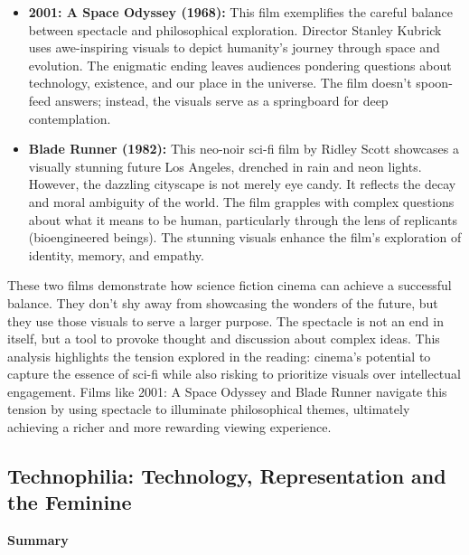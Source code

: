 \documentclass[11pt,fleqn]{book}
\begin{document}
\begin{itemize}
\item \textbf{2001: A Space Odyssey (1968):} This film exemplifies the careful balance between spectacle and philosophical exploration. Director Stanley Kubrick uses awe-inspiring visuals  to depict humanity's journey through space and evolution. The enigmatic ending leaves audiences pondering questions about  technology, existence, and our place in the universe. The film doesn't spoon-feed answers; instead, the visuals serve as a springboard for deep contemplation. 

\item \textbf{Blade Runner (1982):} This neo-noir sci-fi film by Ridley Scott  showcases a visually stunning future Los Angeles, drenched in rain and neon lights. However, the dazzling cityscape is not merely eye candy. It reflects the decay and moral ambiguity of the world. The film grapples with complex questions about  what it means to be human, particularly through the lens of replicants (bioengineered beings). The stunning visuals enhance the film's exploration of identity, memory, and empathy. 
\end{itemize}
\vspace{5pt}
These two films demonstrate how science fiction cinema can achieve  a successful balance. They don't shy away from  showcasing  the wonders of the future, but they use those visuals to serve a larger purpose. The spectacle is not an end in itself, but a tool to  provoke thought and discussion about complex ideas. This analysis highlights the tension  explored in the reading: cinema's potential to capture the essence of sci-fi while also  risking  to prioritize visuals over intellectual engagement. Films like 2001: A Space Odyssey and Blade Runner navigate this tension  by using spectacle to  illuminate  philosophical themes,  ultimately achieving a richer and more rewarding viewing experience. 

\subsection{Technophilia: Technology, Representation and the Feminine }
\textbf{Summary}
\end{document}
